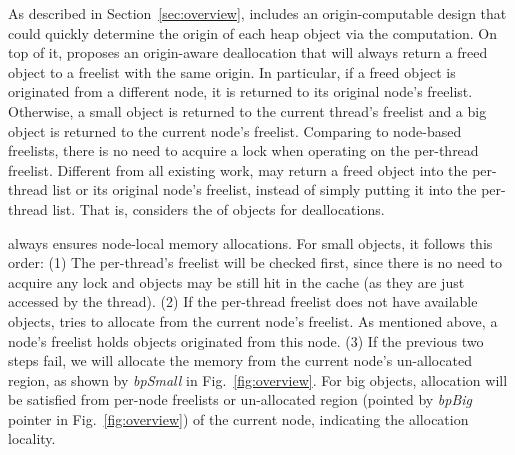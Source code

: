 As described in Section~\ref{sec:overview}, \NM{} includes an origin-computable design that could quickly determine the origin of each heap object via the computation. 
On top of it, \NM{} proposes an origin-aware deallocation that will always return a freed object to a freelist with the same origin. In particular, if a freed object is originated from a different node, it is returned to its original node's  freelist. Otherwise, a small object is returned to the current thread's freelist and a big object is returned to the current node's freelist. Comparing to node-based freelists, there is no need to acquire a lock when operating on the per-thread freelist. Different from all existing work, \NM{} may return a freed object into the per-thread list or its original node's freelist, instead of simply putting it into the per-thread list. That is, \NM{} considers the  of objects for deallocations. 

\NM{} always ensures node-local memory allocations. For small objects, it follows this order: (1) The per-thread's freelist will be checked first, since there is no need to acquire any lock and objects may be still hit in the cache (as they are just accessed by the thread). (2) If the per-thread freelist does not have available objects, \NM{} tries to allocate from the current node's freelist. As mentioned above, a node's freelist holds objects originated from this node. (3) If the previous two steps fail,  we will allocate the memory from the current node's un-allocated region, as shown by \textit{bpSmall} in Fig.~\ref{fig:overview}. 
For big objects, allocation will be satisfied from per-node freelists or un-allocated region (pointed by \textit{bpBig} pointer in Fig.~\ref{fig:overview}) of the current node, indicating the allocation locality. 
